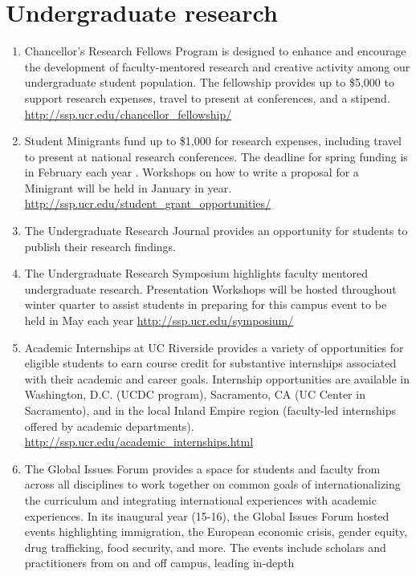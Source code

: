 \documentclass[12pt]{article}
\begin{document}
\section{Undergraduate research}
\begin{enumerate}
\item Chancellor’s Research Fellows Program is designed to enhance and
  encourage the development of faculty-mentored research and creative
  activity among our undergraduate student population. The fellowship
  provides up to \$5,000 to support research expenses, travel to
  present at conferences, and a
  stipend. \url{http://ssp.ucr.edu/chancellor_fellowship/}
\item Student Minigrants fund up to \$1,000 for research expenses,
  including travel to present at national research conferences.  The
  deadline for spring funding is in February each year .  Workshops on
  how to write a proposal for a Minigrant will be held in January in
  year. \url{http://ssp.ucr.edu/student_grant_opportunities/}
\item The Undergraduate Research Journal provides an opportunity for
  students to publish their research findings.
\item The Undergraduate Research Symposium highlights faculty mentored
  undergraduate research.  Presentation Workshops will be hosted
  throughout winter quarter to assist students in preparing for this
  campus event to be held in May each year \url{http://ssp.ucr.edu/symposium/}
\item Academic Internships at UC Riverside provides a variety of
  opportunities for eligible students to earn course credit for
  substantive internships associated with their academic and career
  goals.  Internship opportunities are available in Washington,
  D.C. (UCDC program), Sacramento, CA (UC Center in Sacramento), and
  in the local Inland Empire region (faculty-led internships offered
  by academic
  departments). \url{http://ssp.ucr.edu/academic_internships.html}
\item The Global Issues Forum provides a space for students and
  faculty from across all disciplines to work together on common goals
  of internationalizing the curriculum and integrating international
  experiences with academic experiences.  In its inaugural year
  (15-16), the Global Issues Forum hosted events highlighting
  immigration, the European economic crisis, gender equity, drug
  trafficking, food security, and more.  The events include scholars
  and practitioners from on and off campus, leading in-depth

\end{enumerate}
\end{document}
